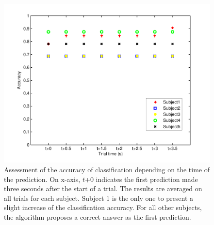  \begin{figure}[!t]
    \centering
    \includegraphics[width=0.8\columnwidth]{Figures/accuracy.pdf}
    \caption{Assessment of the accuracy of classification depending on the time of the prediction. On x-axis, $t$+0 indicates the first prediction made three seconds after the start of a trial. The results are averaged on all trials for each subject. Subject 1 is the only one to present a slight increase of the classification accuracy. For all other subjects, the algorithm proposes a correct answer as the first prediction.}
    \label{fig:accuracy}
\end{figure}




